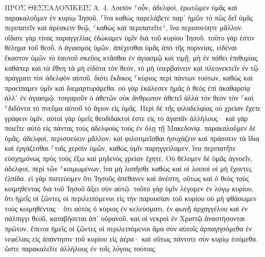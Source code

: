 \documentclass[twoside, 9pt]{extreport}
\begin{document}
ΠΡΟΣ ΘΕΣΣΑΛΟΝΙΚΕΙΣ Α.
4.
Λοιπὸν ⸀οὖν, ἀδελφοί, ἐρωτῶμεν ὑμᾶς καὶ παρακαλοῦμεν ἐν κυρίῳ Ἰησοῦ, ⸀ἵνα καθὼς παρελάβετε παρ᾽ ἡμῶν τὸ πῶς δεῖ ὑμᾶς περιπατεῖν καὶ ἀρέσκειν θεῷ, ⸂καθὼς καὶ περιπατεῖτε⸃, ἵνα περισσεύητε μᾶλλον. 
οἴδατε γὰρ τίνας παραγγελίας ἐδώκαμεν ὑμῖν διὰ τοῦ κυρίου Ἰησοῦ. 
τοῦτο γάρ ἐστιν θέλημα τοῦ θεοῦ, ὁ ἁγιασμὸς ὑμῶν, ἀπέχεσθαι ὑμᾶς ἀπὸ τῆς πορνείας, 
εἰδέναι ἕκαστον ὑμῶν τὸ ἑαυτοῦ σκεῦος κτᾶσθαι ἐν ἁγιασμῷ καὶ τιμῇ, 
μὴ ἐν πάθει ἐπιθυμίας καθάπερ καὶ τὰ ἔθνη τὰ μὴ εἰδότα τὸν θεόν, 
τὸ μὴ ὑπερβαίνειν καὶ πλεονεκτεῖν ἐν τῷ πράγματι τὸν ἀδελφὸν αὐτοῦ, διότι ἔκδικος ⸀κύριος περὶ πάντων τούτων, καθὼς καὶ προείπαμεν ὑμῖν καὶ διεμαρτυράμεθα. 
οὐ γὰρ ἐκάλεσεν ἡμᾶς ὁ θεὸς ἐπὶ ἀκαθαρσίᾳ ἀλλ᾽ ἐν ἁγιασμῷ. 
τοιγαροῦν ὁ ἀθετῶν οὐκ ἄνθρωπον ἀθετεῖ ἀλλὰ τὸν θεὸν τὸν ⸀καὶ ⸀διδόντα τὸ πνεῦμα αὐτοῦ τὸ ἅγιον εἰς ὑμᾶς. 
Περὶ δὲ τῆς φιλαδελφίας οὐ χρείαν ἔχετε γράφειν ὑμῖν, αὐτοὶ γὰρ ὑμεῖς θεοδίδακτοί ἐστε εἰς τὸ ἀγαπᾶν ἀλλήλους· 
καὶ γὰρ ποιεῖτε αὐτὸ εἰς πάντας τοὺς ἀδελφοὺς τοὺς ἐν ὅλῃ τῇ Μακεδονίᾳ. παρακαλοῦμεν δὲ ὑμᾶς, ἀδελφοί, περισσεύειν μᾶλλον, 
καὶ φιλοτιμεῖσθαι ἡσυχάζειν καὶ πράσσειν τὰ ἴδια καὶ ἐργάζεσθαι ⸀ταῖς χερσὶν ὑμῶν, καθὼς ὑμῖν παρηγγείλαμεν, 
ἵνα περιπατῆτε εὐσχημόνως πρὸς τοὺς ἔξω καὶ μηδενὸς χρείαν ἔχητε. 
Οὐ θέλομεν δὲ ὑμᾶς ἀγνοεῖν, ἀδελφοί, περὶ τῶν ⸀κοιμωμένων, ἵνα μὴ λυπῆσθε καθὼς καὶ οἱ λοιποὶ οἱ μὴ ἔχοντες ἐλπίδα. 
εἰ γὰρ πιστεύομεν ὅτι Ἰησοῦς ἀπέθανεν καὶ ἀνέστη, οὕτως καὶ ὁ θεὸς τοὺς κοιμηθέντας διὰ τοῦ Ἰησοῦ ἄξει σὺν αὐτῷ. 
τοῦτο γὰρ ὑμῖν λέγομεν ἐν λόγῳ κυρίου, ὅτι ἡμεῖς οἱ ζῶντες οἱ περιλειπόμενοι εἰς τὴν παρουσίαν τοῦ κυρίου οὐ μὴ φθάσωμεν τοὺς κοιμηθέντας· 
ὅτι αὐτὸς ὁ κύριος ἐν κελεύσματι, ἐν φωνῇ ἀρχαγγέλου καὶ ἐν σάλπιγγι θεοῦ, καταβήσεται ἀπ᾽ οὐρανοῦ, καὶ οἱ νεκροὶ ἐν Χριστῷ ἀναστήσονται πρῶτον, 
ἔπειτα ἡμεῖς οἱ ζῶντες οἱ περιλειπόμενοι ἅμα σὺν αὐτοῖς ἁρπαγησόμεθα ἐν νεφέλαις εἰς ἀπάντησιν τοῦ κυρίου εἰς ἀέρα· καὶ οὕτως πάντοτε σὺν κυρίῳ ἐσόμεθα. 
ὥστε παρακαλεῖτε ἀλλήλους ἐν τοῖς λόγοις τούτοις. 
\end{document}
